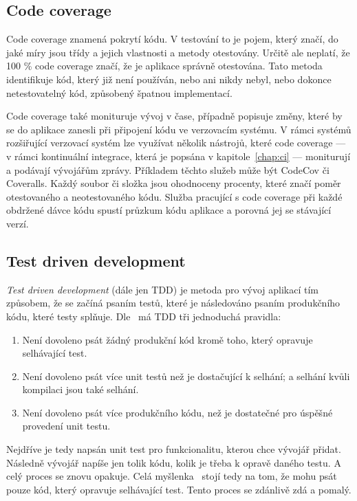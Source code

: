 \subsection{Code coverage}

Code coverage znamená pokrytí kódu.
V testování to je pojem,
který značí,
do jaké míry jsou třídy a jejich vlastnosti a metody otestovány.
Určitě ale neplatí,
že 100 \% code coverage značí,
že je aplikace správně otestována.
Tato metoda identifikuje kód,
který již není používán,
nebo ani nikdy nebyl,
nebo dokonce netestovatelný kód,
způsobený špatnou implementací.
\cite{code_coverage}

Code coverage také monituruje vývoj v čase,
případně popisuje změny,
které by se do aplikace zanesli při připojení kódu ve verzovacím systému.
V rámci systémů rozšiřující verzovací systém lze využívat několik nástrojů,
které code coverage
--- v rámci kontinuální integrace, která je popsána v kapitole~\ref{chap:ci} ---
moniturují a podávají vývojářům zprávy.
Příkladem těchto služeb může být CodeCov či Coveralls.
Každý soubor či složka jsou ohodnoceny procenty,
které značí poměr otestovaného a neotestovaného kódu.
Služba pracující s code coverage při každé obdržené dávce kódu spustí
průzkum kódu aplikace a porovná jej se stávající verzí.
\cite{code_coverage}

\subsection{Test driven development}
\label{sec:tdd}

\emph{Test driven development} (dále jen TDD) je metoda pro vývoj aplikací tím
způsobem,
že se začíná psaním testů,
které je následováno psaním produkčního kódu,
které testy splňuje.
Dle~\cite{tdd} má TDD tři jednoduchá pravidla:

\begin{enumerate}
    \item Není dovoleno psát žádný produkční kód kromě toho,
    který opravuje selhávající test.
    \item Není dovoleno psát více unit testů než je dostačující k selhání;
    a selhání kvůli kompilaci jsou také selhání.
    \item Není dovoleno psát více produkčního kódu,
    než je dostatečné pro úspěšné provedení unit testu.
\end{enumerate}

Nejdříve je tedy napsán unit test pro funkcionalitu,
kterou chce vývojář přidat.
Následně vývojář napíše jen tolik kódu,
kolik je třeba k opravě daného testu.
A celý proces se znovu opakuje.
Celá myšlenka~\cite{tdd} stojí tedy na tom,
že mohu psát pouze kód,
který opravuje selhávající test.
Tento proces se zdánlivě zdá  a pomalý.
~\cite{tdd}
 
